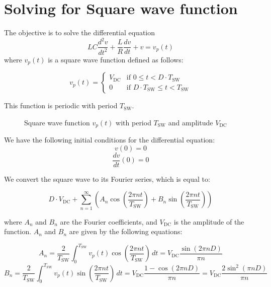\documentclass{article}
\begin{document}
\section{Solving for Square wave function}

The objective is to solve the differential equation
\[ LC \frac{d^2 v}{dt^2} + \frac{L}{R} \frac{dv}{dt} + v = v_p(t) \]
where \( v_p(t) \) is a square wave function defined as follows:

\[
v_p(t) =
\begin{cases}
V_{\text{DC}} & \text{if } 0 \leq t < D \cdot T_{\text{SW}} \\
0 & \text{if } D \cdot T_{\text{SW}} \leq t < T_{\text{SW}}
\end{cases}
\]

This function is periodic with period \( T_{\text{SW}} \).

\begin{figure}[h]
\centering
{}
\caption{Square wave function \( v_p(t) \) with period \( T_{\text{SW}} \) and amplitude \( V_{\text{DC}} \)}
\label{fig:square_wave}
\end{figure}

We have the following initial conditions for the differential equation:
\[ v(0) = 0 \]
\[ \frac{dv}{dt}(0) = 0 \]

We convert the square wave to its Fourier series, which is equal to:

\[
D \cdot V_{\text{DC}} + \sum_{n=1}^{\infty} \left( A_n \cos\left(\frac{2\pi n t}{T_{\text{SW}}}\right) + B_n \sin\left(\frac{2\pi n t}{T_{\text{SW}}}\right) \right)
\]

where \( A_n \) and \( B_n \) are the Fourier coefficients, and \( V_{\text{DC}} \) is the amplitude of the function.
\(A_n\) and \(B_n\) are given by the following equations:

\[A_n = \frac{2}{T_{\text{SW}}} \int_{0}^{T_{\text{SW}}} v_p(t) \cos\left(\frac{2\pi n t}{T_{\text{SW}}}\right) \, dt = V_{\text{DC}} \frac{\sin\left(2 \pi n D\right)}{\pi n}\]
\[B_n = \frac{2}{T_{\text{SW}}} \int_{0}^{T_{\text{SW}}} v_p(t) \sin\left(\frac{2\pi n t}{T_{\text{SW}}}\right) \, dt = V_{\text{DC}} \frac{1 - \cos\left(2 \pi n D\right)}{\pi n}= V_{\text{DC}} \frac{2 \sin^2\left(\pi n D\right)}{\pi n}\]
\end{document}
